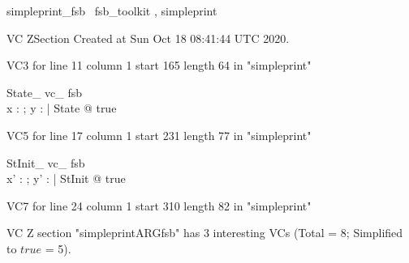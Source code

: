 \documentclass{article}
\begin{document}

\begin{zsection}	 \SECTION simpleprint\_fsb \parents~fsb\_toolkit , simpleprint
\end{zsection}

VC ZSection Created at Sun Oct 18 08:41:44 UTC 2020.

VC3 for line 11 column 1 start 165 length 64 in "simpleprint"
\begin{theorem}{ State\_ vc\_ fsb}\\
 \exists x : \nat ; y : \nat | State @ true \\

\end{theorem}

VC5 for line 17 column 1 start 231 length 77 in "simpleprint"
\begin{theorem}{ StInit\_ vc\_ fsb}\\
 \exists x' : \nat ; y' : \nat | StInit @ true \\

\end{theorem}

VC7 for line 24 column 1 start 310 length 82 in "simpleprint"



 VC Z section "simpleprintARGfsb" has $3$ interesting VCs (Total = 8; Simplified to $true$ = 5).



\end{document}
